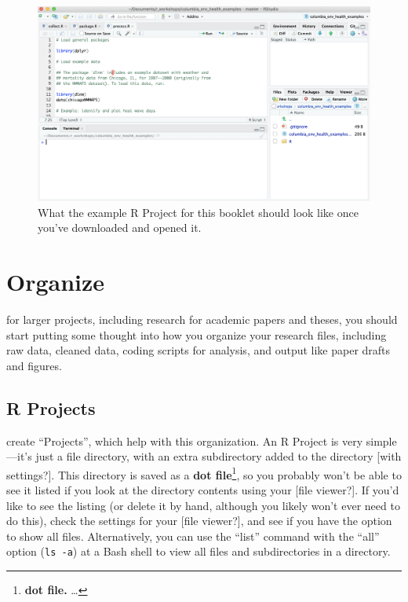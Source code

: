 \documentclass[]{tufte-book}
\begin{document}
\begin{figure}
\includegraphics[width=28.86in]{images/example_repo} \caption[What the example R Project for this booklet should look like once you've downloaded and opened it]{What the example R Project for this booklet should look like once you've downloaded and opened it.}\label{fig:examplerepo}
\end{figure}

\hypertarget{organize}{%
\chapter{Organize}\label{organize}}

 for larger projects, including research
for academic papers and theses, you should start putting some thought into how you
organize your research files, including raw data, cleaned data, coding scripts for
analysis, and output like paper drafts and figures.

\hypertarget{r-projects}{%
\section{R Projects}\label{r-projects}}

 create ``Projects'', which help with this
organization. An R Project is very simple---it's just a file directory, with an
extra subdirectory added to the directory {[}with settings?{]}. This directory is
saved as a \textbf{dot file}\footnote{\textbf{dot file.} \ldots{}}, so you probably won't be able to see it
listed if you look at the directory contents using your {[}file viewer?{]}. If you'd like
to see the listing (or delete it by hand, although you likely won't ever need to
do this), check the settings for your {[}file viewer?{]}, and see if you have the option
to show all files. Alternatively, you can use the ``list'' command with the ``all'' option
(\texttt{ls\ -a}) at a Bash shell to view all files and subdirectories in a directory.
\end{document}
